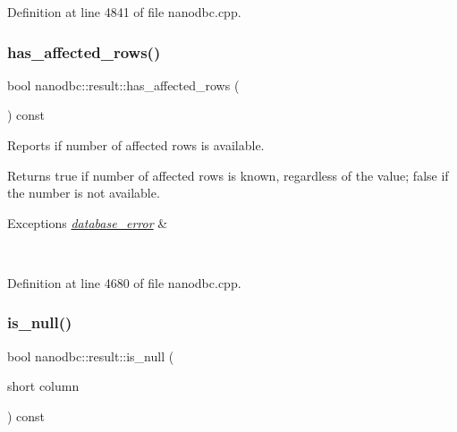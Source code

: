 Definition at line 4841 of file nanodbc.\+cpp.

\mbox{\label{classnanodbc_1_1result_aba877de8e2cb4e17235464b3b9b7c069}} 
\subsubsection{\texorpdfstring{has\_affected\_rows()}{has\_affected\_rows()}}
{\footnotesize\ttfamily bool nanodbc\+::result\+::has\+\_\+affected\+\_\+rows (\begin{DoxyParamCaption}{ }\end{DoxyParamCaption}) const}



Reports if number of affected rows is available. 

\begin{DoxyReturn}{Returns}
true if number of affected rows is known, regardless of the value; false if the number is not available. 
\end{DoxyReturn}

\begin{DoxyExceptions}{Exceptions}
{\em \mbox{\hyperlink{classnanodbc_1_1database__error}{database\+\_\+error}}} & 
\begin{DoxyCode}{1}
\end{DoxyCode}
 \\
\hline
\end{DoxyExceptions}


Definition at line 4680 of file nanodbc.\+cpp.

\mbox{\label{classnanodbc_1_1result_a85462f6eaed91a5b03739319bd2712e7}} 
\subsubsection{\texorpdfstring{is\_null()}{is\_null()}\hspace{0.1cm}{\footnotesize\ttfamily [1/2]}}
{\footnotesize\ttfamily bool nanodbc\+::result\+::is\+\_\+null (\begin{DoxyParamCaption}\item[{short}]{column }\end{DoxyParamCaption}) const}



